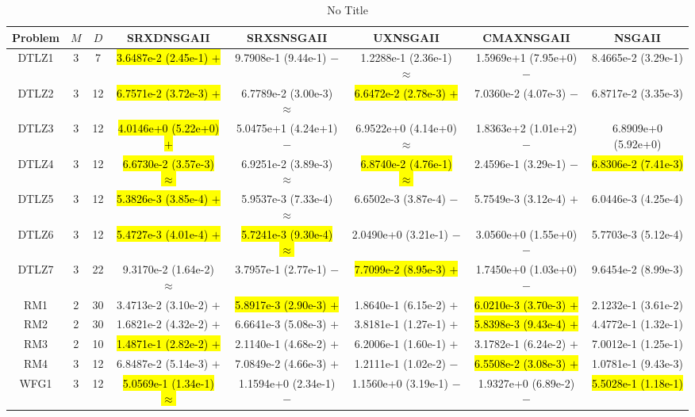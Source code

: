 \documentclass[journal]{IEEEtran}
\begin{document}
\begin{table*}[htbp]
\renewcommand{\arraystretch}{1.2}
\centering
\caption{No Title}
\begin{tabular}{cccccccc}
\toprule
Problem&$M$&$D$&SRXDNSGAII&SRXSNSGAII&UXNSGAII&CMAXNSGAII&NSGAII\\
\midrule
\multirow{1}{*}{DTLZ1}&3&7&\hl{3.6487e-2 (2.45e-1) $+$}&9.7908e-1 (9.44e-1) $-$&1.2288e-1 (2.36e-1) $\approx$&1.5969e+1 (7.95e+0) $-$&8.4665e-2 (3.29e-1)\\
\hline
\multirow{1}{*}{DTLZ2}&3&12&\hl{6.7571e-2 (3.72e-3) $+$}&6.7789e-2 (3.00e-3) $\approx$&\hl{6.6472e-2 (2.78e-3) $+$}&7.0360e-2 (4.07e-3) $-$&6.8717e-2 (3.35e-3)\\
\hline
\multirow{1}{*}{DTLZ3}&3&12&\hl{4.0146e+0 (5.22e+0) $+$}&5.0475e+1 (4.24e+1) $-$&6.9522e+0 (4.14e+0) $\approx$&1.8363e+2 (1.01e+2) $-$&6.8909e+0 (5.92e+0)\\
\hline
\multirow{1}{*}{DTLZ4}&3&12&\hl{6.6730e-2 (3.57e-3) $\approx$}&6.9251e-2 (3.89e-3) $\approx$&\hl{6.8740e-2 (4.76e-1) $\approx$}&2.4596e-1 (3.29e-1) $-$&\hl{6.8306e-2 (7.41e-3)}\\
\hline
\multirow{1}{*}{DTLZ5}&3&12&\hl{5.3826e-3 (3.85e-4) $+$}&5.9537e-3 (7.33e-4) $\approx$&6.6502e-3 (3.87e-4) $-$&5.7549e-3 (3.12e-4) $+$&6.0446e-3 (4.25e-4)\\
\hline
\multirow{1}{*}{DTLZ6}&3&12&\hl{5.4727e-3 (4.01e-4) $+$}&\hl{5.7241e-3 (9.30e-4) $\approx$}&2.0490e+0 (3.21e-1) $-$&3.0560e+0 (1.55e+0) $-$&5.7703e-3 (5.12e-4)\\
\hline
\multirow{1}{*}{DTLZ7}&3&22&9.3170e-2 (1.64e-2) $\approx$&3.7957e-1 (2.77e-1) $-$&\hl{7.7099e-2 (8.95e-3) $+$}&1.7450e+0 (1.03e+0) $-$&9.6454e-2 (8.99e-3)\\
\hline
\multirow{1}{*}{RM1}&2&30&3.4713e-2 (3.10e-2) $+$&\hl{5.8917e-3 (2.90e-3) $+$}&1.8640e-1 (6.15e-2) $+$&\hl{6.0210e-3 (3.70e-3) $+$}&2.1232e-1 (3.61e-2)\\
\hline
\multirow{1}{*}{RM2}&2&30&1.6821e-2 (4.32e-2) $+$&6.6641e-3 (5.08e-3) $+$&3.8181e-1 (1.27e-1) $+$&\hl{5.8398e-3 (9.43e-4) $+$}&4.4772e-1 (1.32e-1)\\
\hline
\multirow{1}{*}{RM3}&2&10&\hl{1.4871e-1 (2.82e-2) $+$}&2.1140e-1 (4.68e-2) $+$&6.2006e-1 (1.60e-1) $+$&3.1782e-1 (6.24e-2) $+$&7.0012e-1 (1.25e-1)\\
\hline
\multirow{1}{*}{RM4}&3&12&6.8487e-2 (5.14e-3) $+$&7.0849e-2 (4.66e-3) $+$&1.2111e-1 (1.02e-2) $-$&\hl{6.5508e-2 (3.08e-3) $+$}&1.0781e-1 (9.43e-3)\\
\hline
\multirow{1}{*}{WFG1}&3&12&\hl{5.0569e-1 (1.34e-1) $\approx$}&1.1594e+0 (2.34e-1) $-$&1.1560e+0 (3.19e-1) $-$&1.9327e+0 (6.89e-2) $-$&\hl{5.5028e-1 (1.18e-1)}\\

\end{tabular}
\end{table*}
\end{document}
